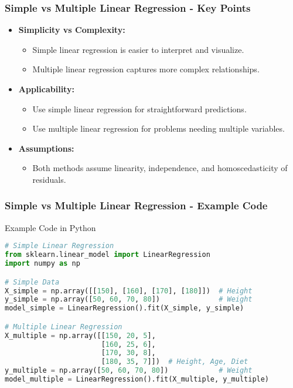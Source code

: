 \documentclass[aspectratio=169]{beamer}
\begin{document}
\begin{frame}[fragile]
  \frametitle{Simple vs Multiple Linear Regression - Key Points}
  \begin{itemize}
    \item \textbf{Simplicity vs Complexity:} 
      \begin{itemize}
        \item Simple linear regression is easier to interpret and visualize.
        \item Multiple linear regression captures more complex relationships.
      \end{itemize}
    \item \textbf{Applicability:} 
      \begin{itemize}
        \item Use simple linear regression for straightforward predictions.
        \item Use multiple linear regression for problems needing multiple variables.
      \end{itemize}
    \item \textbf{Assumptions:} 
      \begin{itemize}
        \item Both methods assume linearity, independence, and homoscedasticity of residuals.
      \end{itemize}
  \end{itemize}
\end{frame}

\begin{frame}[fragile]
  \frametitle{Simple vs Multiple Linear Regression - Example Code}
  \begin{block}{Example Code in Python}
    \begin{lstlisting}[language=Python]
# Simple Linear Regression
from sklearn.linear_model import LinearRegression
import numpy as np

# Simple Data
X_simple = np.array([[150], [160], [170], [180]])  # Height
y_simple = np.array([50, 60, 70, 80])              # Weight
model_simple = LinearRegression().fit(X_simple, y_simple)

# Multiple Linear Regression
X_multiple = np.array([[150, 20, 5], 
                       [160, 25, 6], 
                       [170, 30, 8], 
                       [180, 35, 7]])  # Height, Age, Diet
y_multiple = np.array([50, 60, 70, 80])            # Weight
model_multiple = LinearRegression().fit(X_multiple, y_multiple)
    \end{lstlisting}
  \end{block}
\end{frame}
\end{document}
